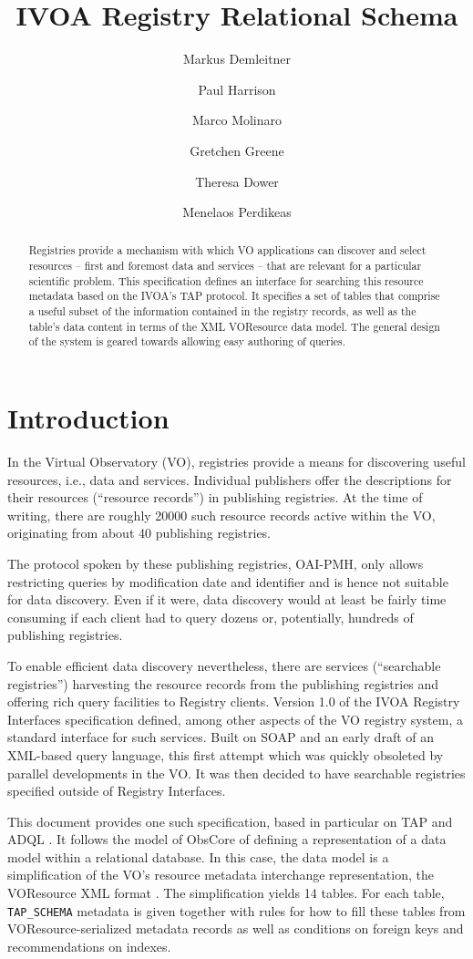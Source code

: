 \documentclass[11pt,a4paper]{ivoa}
\author[http://www.ivoa.net/cgi-bin/twiki/bin/view/IVOA/MarkusDemleitner]{Markus Demleitner}
\author[http://www.ivoa.net/cgi-bin/twiki/bin/view/IVOA/PaulHarrison]{Paul Harrison}
\author[http://www.ivoa.net/cgi-bin/twiki/bin/view/IVOA/MarcoMolinaro]{Marco Molinaro}
\author[http://www.ivoa.net/cgi-bin/twiki/bin/view/IVOA/GretchenGreene]{Gretchen Greene}
\author[http://www.ivoa.net/cgi-bin/twiki/bin/view/IVOA/TheresaDower]{Theresa Dower}
\author[http://wiki.ivoa.net/twiki/bin/view/IVOA/MenelaosPerdikeas]{Menelaos Perdikeas}
\title{IVOA Registry Relational Schema}
\newcommand{\tapent}[1]{\texttt{\color{tapcolor} #1}}
\begin{document}
\begin{abstract}
Registries provide a mechanism with which VO applications can
discover and select resources -- first and foremost data and
services -- that are relevant for a particular scientific problem.
This specification defines  an interface for searching this resource
metadata based on the IVOA's TAP protocol.  It specifies a set of tables
that comprise a useful subset of the information contained in the
registry records, as well as the table's data content in terms of the
XML VOResource data model.  The general design of the system is geared
towards allowing easy authoring of queries.
\end{abstract}


\section{Introduction}

\label{intro}

In the Virtual Observatory (VO), registries provide a means for
discovering useful resources, i.e., data and services.  Individual
publishers offer the descriptions for their resources (``resource
records'') in publishing registries.  At the time of writing, there are
roughly 20000 such resource records active within the VO, originating
from about 40 publishing registries.

The protocol spoken by these
publishing registries, OAI-PMH, only allows restricting queries by
modification date and identifier and is hence not suitable for data discovery.
Even if it were, data discovery would at least be fairly time consuming if
each client had to query dozens or, potentially, hundreds of
publishing registries.

To enable efficient data discovery nevertheless, there are services
(``searchable registries'') harvesting the
resource records from the publishing registries and offering rich query
facilities to Registry clients. 
Version 1.0 of the IVOA Registry
Interfaces specification \citep{std:RI1} defined, among other aspects of
the VO registry system, a standard interface for such services.
Built on SOAP and an early draft of an XML-based query language,
this first attempt which was quickly obsoleted by parallel
developments in the VO.  It was then decided to have searchable
registries specified outside of Registry Interfaces.

This document provides one such specification, based in particular on TAP \citep{std:TAP}
and ADQL \citep{std:ADQL}.  It follows the model of ObsCore
\citep{std:OBSCORE} of defining a representation of a data model
within a relational database.  In this case, the data model is a
simplification of the VO's resource metadata interchange representation,
the VOResource XML format \citep{2018ivoa.spec.0625P}.  The simplification
yields 14 tables.  For each table, \tapent{TAP\_SCHEMA} metadata is given together
with rules for how to fill these tables from VOResource-serialized
metadata records as well as conditions on foreign keys and
recommendations on indexes.
\end{document}
